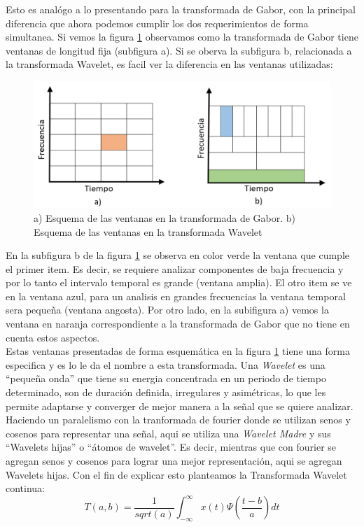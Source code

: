 \documentclass{article}
\begin{document}
Esto es analógo a lo presentando para la transformada de Gabor, con la principal diferencia que ahora podemos cumplir los dos requerimientos de forma simultanea. Si vemos la figura \ref{comp} observamos como la transformada de Gabor tiene ventanas de longitud fija (subfigura a).
Si se oberva la subfigura b, relacionada a la transformada Wavelet, es facil ver la diferencia en las ventanas utilizadas:
\begin{figure}[H]
    \centering
    \includegraphics[scale=0.45]{Fig/6}
    \caption{a) Esquema de las ventanas en la transformada de Gabor. b) Esquema de las ventanas en la transformada Wavelet}
    \label{comp}
\end{figure}
En la subfigura b de la figura \ref{comp} se observa en color verde la ventana que cumple el primer item. Es decir, se requiere analizar componentes de baja frecuencia y por lo tanto el intervalo temporal es grande (ventana amplia). El otro item se ve en la ventana azul, para un analisis 
en grandes frecuencias la ventana temporal sera pequeña (ventana angosta). Por otro lado, en la subifigura a) vemos la ventana en naranja correspondiente a la transformada de Gabor que no tiene en cuenta estos aspectos.\\
Estas ventanas presentadas de forma esquemática en la figura \ref{comp} tiene una forma especifica y es lo le da el nombre a esta transformada. Una \textit{Wavelet} es una ``pequeña onda'' que tiene su energia concentrada en un periodo de tiempo determinado, son de duración definida, irregulares y asimétricas, lo que les permite 
adaptarse y converger de mejor manera a la señal que se quiere analizar. Haciendo un paralelismo con la tranformada de fourier donde se utilizan senos y cosenos para representar una señal, aqui se utiliza una \textit{Wavelet Madre} y sus ``Wavelets hijas'' o ``átomos de wavelet''. Es decir, mientras que con fourier se agregan senos y cosenos para lograr 
una mejor representación, aqui se agregan Wavelets hijas. Con el fin de explicar esto planteamos la Transformada Wavelet continua:
\begin{equation}
    \label{TOC}
    T(a,b)= \frac{1}{sqrt(a)} \int_{-\infty}^{\infty} x(t) \Psi(\frac{t-b}{a}) dt
\end{equation}
\end{document}
